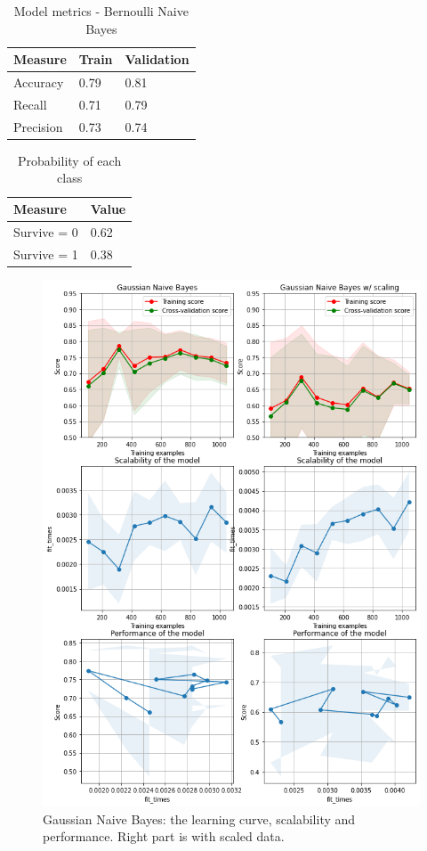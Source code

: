\documentclass{article}
\begin{document}
\begin{table}[H]
	\centering
	\caption{Model metrics - Bernoulli Naive Bayes}
	\label{tab:Bernoulli-metrics}
	\begin{tabular}{|l|l|l|}
		\hline
		\textbf{Measure} & \textbf{Train} & \textbf{Validation} \\ \hline
		Accuracy       	 & 0.79    & 0.81 \\ \hline
		Recall    		 & 0.71    & 0.79 \\ \hline
		Precision    	 & 0.73    & 0.74 \\ \hline
	\end{tabular}
\end{table}

\begin{table}[H]
	\centering
	\caption{Probability of each class}
	\label{tab:NB-probabilities}
	\begin{tabular}{|l|l|}
		\hline
		\textbf{Measure} & \textbf{Value} \\ \hline
		Survive  = 0     & 0.62    \\ \hline
		Survive  = 1     & 0.38   \\ \hline
	\end{tabular}
\end{table}

\begin{figure}[H]
	\includegraphics[width=\textwidth,height=\textheight,keepaspectratio]{gaussianNB_curve.png}
	\caption{Gaussian Naive Bayes: the learning curve, scalability and performance. Right part is with scaled data.}
	\label{fig:Gaussian-curve}
\end{figure}
\end{document}

